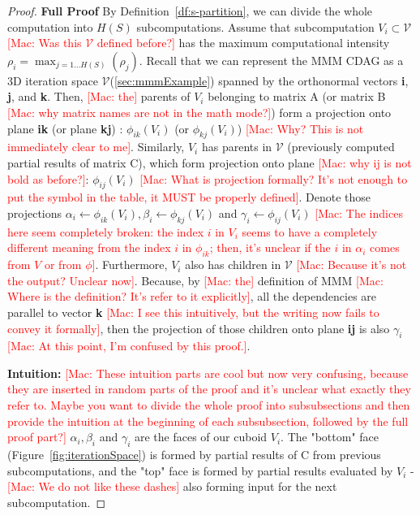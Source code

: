 \documentclass[sigplan,review,anonymous]{acmart}\settopmatter{printfolios=true,printccs=false,printacmref=false}
\newcommand\mac[1]{\textcolor{red}{[Mac: #1]}}
\newcommand{\macb}[1]{\textbf{\textsf{#1}}}
\begin{document}
\begin{proof}
\macb{Full Proof}
%
By Definition~\ref{df:s-partition}, we can divide the whole computation into
$H(S)$ subcomputations. Assume that subcomputation $V_i \subset \mathcal{V}$
\mac{Was this $\mathcal{V}$ defined before?} has the maximum computational
intensity $\rho_i = \max_{j = 1 \dots H(S)}(\rho_j)$. Recall that we can
represent the MMM CDAG as a 3D iteration space
$\mathcal{V}$(\cref{sec:mmmExample}) spanned by the orthonormal vectors
\textbf{i}, \textbf{j}, and \textbf{k}. Then, \mac{the} parents of $V_i$
belonging to matrix A (or matrix B \mac{why matrix names are not in the math
mode?}) form a projection onto plane \textbf{ik} (or plane \textbf{kj}) :
$\phi_{ik}(V_i)$ (or $\phi_{kj}(V_i)$) \mac{Why? This is not immediately clear
to me}. Similarly, $V_i$ has parents in  $\mathcal{V}$ (previously computed
partial results of matrix C), which form projection onto plane 
\mac{why ij is not bold as before?}: $\phi_{ij}(V_i)$ \mac{What is projection
formally?  It's not enough to put the symbol in the table, it MUST be properly
defined}. Denote those projections $\alpha_i \gets \phi_{ik}(V_i), \beta_i
\gets \phi_{kj}(V_i)$ and $\gamma_i \gets \phi_{ij}(V_i)$ \mac{The indices here
seem completely broken: the index $i$ in $V_i$ seems to have a completely
different meaning from the index $i$ in $\phi_{ik}$; then, it's unclear if the
$i$ in $\alpha_i$ comes from $V$ or from $\phi$}. Furthermore, $V_i$ also has
children in $\mathcal{V}$ \mac{Because it's not the output? Unclear now}.
Because, by \mac{the} definition of MMM \mac{Where is the definition? It's
refer to it explicitly}, all the dependencies are parallel to vector \textbf{k}
\mac{I see this intuitively, but the writing now fails to convey it formally},
then the projection of those children onto plane \textbf{ij} is also $\gamma_i$
\mac{At this point, I'm confused by this proof.}.

\textbf{Intuition:} \mac{These intuition parts are cool but now very confusing,
because they are inserted in random parts of the proof and it's unclear what
exactly they refer to. Maybe you want to divide the whole proof into
subsubsections and then provide the intuition at the beginning of each
subsubsection, followed by the full proof part?} $\alpha_i, \beta_i$ and
$\gamma_i$ are the faces of our cuboid $V_i$. The "bottom" face
(Figure~\ref{fig:iterationSpace}) is formed by partial results of C from
previous subcomputations, and the "top" face is formed by partial results
evaluated by $V_i$ - \mac{We do not like these dashes} also forming input for
the next subcomputation.


\end{proof}
\end{document}
